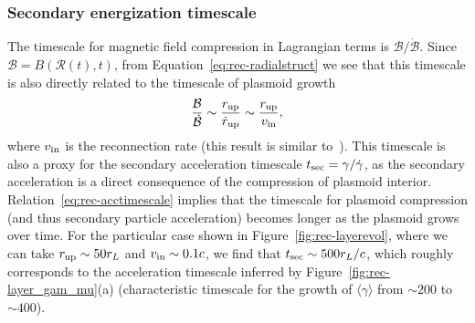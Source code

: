 \subsubsection{Secondary energization timescale}



The timescale for magnetic field compression in Lagrangian terms is $\mathcal{B} / \dot{\mathcal{B}}$. Since $\mathcal{B} = B(\mathcal{R}(t), t)$, from Equation~\eqref{eq:rec-radialstruct} we see that this timescale is also directly related to the timescale of plasmoid growth
\begin{equation}
    \label{eq:rec-acctimescale}
    \frac{\mathcal{B}}{\dot{\mathcal{B}}} \sim \frac{r_{\rm up}}{\dot{r}_{\rm up}} \sim \frac{r_{\rm up}}{v_{\rm in}},
\end{equation}
where $v_{\rm in}$ is the reconnection rate (this result is similar to~\citealt{2016MNRAS.462...48S}). This timescale is also a proxy for the secondary acceleration timescale $t_{\rm sec} = \gamma / \dot{\gamma}$, as the secondary acceleration is a direct consequence of the compression of plasmoid interior. Relation~\eqref{eq:rec-acctimescale} implies that the timescale for plasmoid compression (and thus secondary particle acceleration) becomes longer as the plasmoid grows over time. For the particular case shown in Figure~\ref{fig:rec-layerevol}, where we can take $r_{\rm up}\sim 50r_L$ and $v_{\rm in}\sim 0.1 c$, we find that $t_{\rm sec}\sim 500r_L / c$, which roughly corresponds to the acceleration timescale inferred by Figure~\ref{fig:rec-layer_gam_mu}(a) (characteristic timescale for the growth of $\langle\gamma\rangle$ from $\sim 200$ to $\sim 400$).

